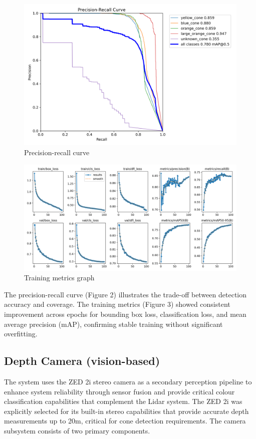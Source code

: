 \documentclass[conference]{IEEEtran}
\begin{document}
\begin{figure}[htbp]
\centerline{\includegraphics[scale=0.4]{images/PR_curve.png}}
\caption{Precision-recall curve}
\label{fig}
\end{figure}

\begin{figure}[htbp]
\centerline{\includegraphics[scale=0.3]{images/results.png}}
\caption{Training metrics graph}
\label{fig}
\end{figure}

The precision-recall curve (Figure 2) illustrates the trade-off between detection accuracy and coverage. The training metrics (Figure 3) showed consistent improvement across epochs for bounding box loss, classification loss, and mean average precision (mAP), confirming stable training without significant overfitting.

\subsection{Depth Camera (vision-based)}
The system uses the ZED 2i stereo camera as a secondary perception pipeline to enhance system reliability through sensor fusion and provide critical colour classification capabilities that complement the Lidar system. The ZED 2i was explicitly selected for its built-in stereo capabilities that provide accurate depth measurements up to 20m, critical for cone detection requirements. The camera subsystem consists of two primary components.
\end{document}

